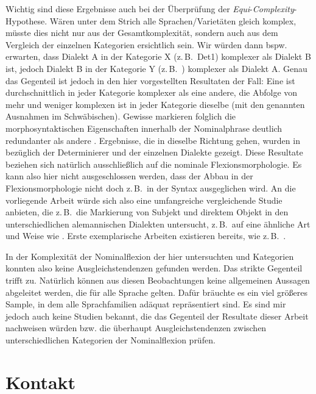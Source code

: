 Wichtig sind diese Ergebnisse auch bei der Überprüfung der \textit{Equi}{}-\textit{Complexity}{}-Hypothese. Wären unter dem Strich alle Sprachen/Varietäten gleich komplex, müsste dies nicht nur aus der Gesamtkomplexität, sondern auch aus dem Vergleich der einzelnen Kategorien ersichtlich sein. Wir würden dann bspw. erwarten, dass Dialekt A in der Kategorie X (z.\,B.\ Det1) komplexer als Dialekt B ist, jedoch Dialekt B in der Kategorie Y (z.\,B.\ ) komplexer als Dialekt A. Genau das Gegenteil ist jedoch in den hier vorgestellten Resultaten der Fall: Eine  ist durchschnittlich in jeder Kategorie komplexer als eine andere, die Abfolge von mehr und weniger komplexen  ist in jeder Kategorie dieselbe (mit den genannten Ausnahmen im Schwäbischen). Gewisse  markieren folglich die morphosyntaktischen Eigenschaften innerhalb der Nominalphrase deutlich redundanter als andere . Ergebnisse, die in dieselbe Richtung gehen, wurden in  bezüglich der Determinierer und  der einzelnen Dialekte gezeigt. Diese Resultate beziehen sich natürlich ausschließlich auf die nominale Flexionsmorphologie. Es kann also hier nicht ausgeschlossen werden, dass der Abbau in der Flexionsmorphologie nicht doch z.\,B.\ in der Syntax ausgeglichen wird. An die vorliegende Arbeit würde sich also eine umfangreiche vergleichende Studie anbieten, die z.\,B.\ die Markierung von Subjekt und direktem Objekt in den unterschiedlichen alemannischen Dialekten untersucht, z.\,B.\ auf eine ähnliche Art und Weise wie \citet{Sinnemäki2008}. Erste exemplarische Arbeiten existieren bereits, wie z.\,B.\ \citet{Ellsäßer2015}.

In der Komplexität der Nominalflexion der hier untersuchten  und Kategorien konnten also keine Ausgleichstendenzen gefunden werden. Das strikte Gegenteil trifft zu. Natürlich können aus diesen Beobachtungen keine allgemeinen Aussagen abgeleitet werden, die für alle Sprache gelten. Dafür bräuchte es ein viel größeres Sample, in dem alle Sprachfamilien adäquat repräsentiert sind. Es sind mir jedoch auch keine Studien bekannt, die das Gegenteil der Resultate dieser Arbeit nachweisen würden bzw. die überhaupt Ausgleichstendenzen zwischen unterschiedlichen Kategorien der Nominalflexion prüfen.

\section{Kontakt}\label{6.3}

